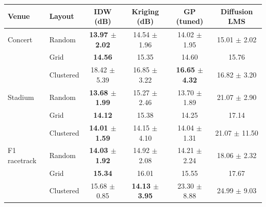 \begin{tabular}{llcccc}
\toprule
Venue & Layout & IDW (dB) & Kriging (dB) & GP (tuned) & Diffusion LMS \\
\midrule
Concert & Random & \textbf{13.97 $\pm$ 2.02} & 14.54 $\pm$ 1.96 & 14.02 $\pm$ 1.95 & 15.01 $\pm$ 2.02 \\
 & Grid & \textbf{14.56} & 15.35 & 14.60 & 15.76 \\
 & Clustered & 18.42 $\pm$ 5.39 & 16.85 $\pm$ 3.22 & \textbf{16.65 $\pm$ 4.32} & 16.82 $\pm$ 3.20 \\
\midrule
Stadium & Random & \textbf{13.68 $\pm$ 1.99} & 15.27 $\pm$ 2.46 & 13.70 $\pm$ 1.89 & 21.07 $\pm$ 2.90 \\
 & Grid & \textbf{14.12} & 15.38 & 14.25 & 17.14 \\
 & Clustered & \textbf{14.01 $\pm$ 1.59} & 14.15 $\pm$ 4.10 & 14.04 $\pm$ 1.31 & 21.07 $\pm$ 11.50 \\
\midrule
F1 racetrack & Random & \textbf{14.03 $\pm$ 1.92} & 14.92 $\pm$ 2.08 & 14.21 $\pm$ 2.24 & 18.06 $\pm$ 2.32 \\
 & Grid & \textbf{15.34} & 16.01 & 15.55 & 17.67 \\
 & Clustered & 15.68 $\pm$ 0.85 & \textbf{14.13 $\pm$ 3.95} & 23.30 $\pm$ 8.88 & 24.99 $\pm$ 9.03 \\
\bottomrule
\end{tabular}
